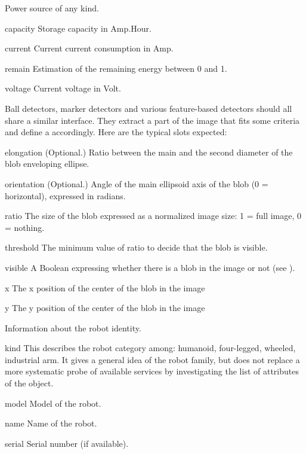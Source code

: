 Power source of any kind.
\begin{urbiscriptapi}
\item[capacity] Storage capacity in Amp.Hour.


\item[current] Current current consumption in Amp.


\item[remain] Estimation of the remaining energy between 0 and 1.


\item[voltage] Current voltage in Volt.
\end{urbiscriptapi}



Ball detectors, marker detectors and various feature-based detectors
should all share a similar interface. They extract a part of the image
that fits some criteria and define a  accordingly. Here are
the typical slots expected:

\begin{urbiscriptapi}
\item[elongation]{} (Optional.)  Ratio between the main and the second
  diameter of the blob enveloping ellipse.


\item[orientation]{} (Optional.)  Angle of the main ellipsoid axis of the blob
  (0 = horizontal), expressed in radians.


\item[ratio] The size of the blob expressed as a normalized image size: 1 =
  full image, 0 = nothing.


\item[threshold] The minimum value of ratio to decide that the blob is
  visible.


\item[visible] A Boolean expressing whether there is a blob in the image or
  not (see ).


\item[x] The x position of the center of the blob in the image


\item[y] The y position of the center of the blob in the image
\end{urbiscriptapi}




Information about the robot identity.
\begin{urbiscriptapi}
\item[kind]%
  This describes the robot category among: humanoid, four-legged, wheeled,
  industrial arm. It gives a general idea of the robot family, but does not
  replace a more systematic probe of available services by investigating the
  list of attributes of the object.


\item[model] Model of the robot.


\item[name]%
  Name of the robot.


\item[serial] Serial number (if available).
\end{urbiscriptapi}


